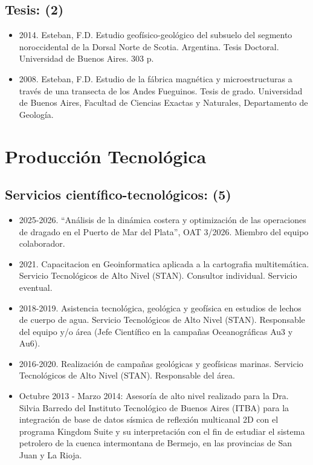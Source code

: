 \documentclass[11pt, a4paper]{article}
\begin{document}
\subsection{Tesis: (2)}

\begin{itemize}
    \item 2014. Esteban, F.D. Estudio geofísico-geológico del subsuelo del segmento noroccidental de la Dorsal Norte de Scotia. Argentina. Tesis Doctoral. Universidad de Buenos Aires. 303 p.
    \item 2008. Esteban, F.D. Estudio de la fábrica magnética y microestructuras a través de una transecta de los Andes Fueguinos. Tesis de grado. Universidad de Buenos Aires, Facultad de Ciencias Exactas y Naturales, Departamento de Geología.
\end{itemize}


\section{Producción Tecnológica}


\subsection{Servicios científico-tecnológicos: (5)}

\begin{itemize}
    \item 2025-2026. “Análisis de la dinámica costera y optimización de las operaciones de dragado en el Puerto de Mar del Plata”, OAT 3/2026. Miembro del equipo colaborador.
    \item 2021. Capacitacion en Geoinformatica aplicada a la cartografia multitemática. Servicio Tecnológicos de Alto Nivel (STAN). Consultor individual. Servicio eventual.
    \item 2018-2019. Asistencia tecnológica, geológica y geofísica en estudios de lechos de cuerpo de agua. Servicio Tecnológicos de Alto Nivel (STAN). Responsable del equipo y/o área (Jefe Científico en la campañas Oceanográficas Au3 y Au6).
    \item 2016-2020. Realización de campañas geológicas y geofísicas marinas. Servicio Tecnológicos de Alto Nivel (STAN). Responsable del área.
    \item Octubre 2013 - Marzo 2014: Asesoría de alto nivel realizado para la Dra. Silvia Barredo del Instituto Tecnológico de Buenos Aires (ITBA) para la integración de base de datos sísmica de reflexión multicanal 2D con el programa Kingdom Suite y su interpretación con el fin de estudiar el sistema petrolero de la cuenca intermontana de Bermejo, en las provincias de San Juan y La Rioja.
\end{itemize}
\end{document}
